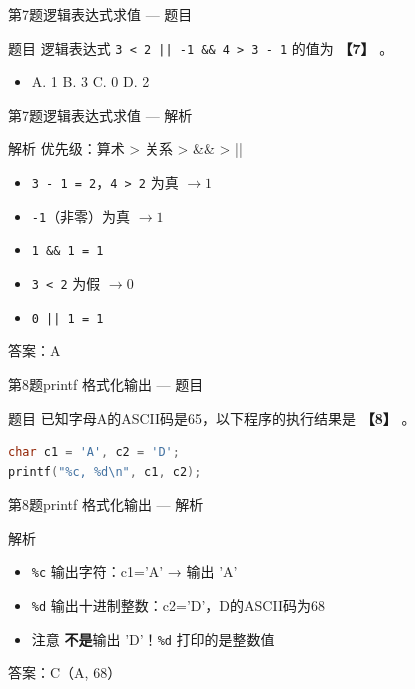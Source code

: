 \begin{frame}{第7题}{逻辑表达式求值 --- 题目}
    \begin{exampleblock}{题目}
        逻辑表达式 \texttt{3 < 2 || -1 \&\& 4 > 3 - 1} 的值为 \textbf{【7】} 。
        \begin{itemize}
            \item A. 1 \quad B. 3 \quad C. 0 \quad D. 2
        \end{itemize}
    \end{exampleblock}
\end{frame}

\begin{frame}{第7题}{逻辑表达式求值 --- 解析}
    \begin{alertblock}{解析}
        \footnotesize 优先级：算术 > 关系 > \&\& > ||
        \begin{itemize}
            \setlength{\itemsep}{0pt}
            \item \texttt{3 - 1 = 2}，\texttt{4 > 2} 为真 $\to 1$
            \item \texttt{-1}（非零）为真 $\to 1$
            \item \texttt{1 \&\& 1 = 1}
            \item \texttt{3 < 2} 为假 $\to 0$
            \item \texttt{0 || 1 = 1}
        \end{itemize}
        {\color{highlight}答案：A}
    \end{alertblock}
\end{frame}

\begin{frame}[fragile]{第8题}{printf 格式化输出 --- 题目}
    \begin{exampleblock}{题目}
        已知字母A的ASCII码是65，以下程序的执行结果是 \textbf{【8】} 。
    \end{exampleblock}

    \begin{lstlisting}[language=C, basicstyle=\footnotesize\ttfamily]
char c1 = 'A', c2 = 'D';
printf("%c, %d\n", c1, c2);
\end{lstlisting}
\end{frame}

\begin{frame}{第8题}{printf 格式化输出 --- 解析}
    \begin{alertblock}{解析}
        \small
        \begin{itemize}
            \item \texttt{\%c} 输出字符：c1='A' → 输出 'A'
            \item \texttt{\%d} 输出十进制整数：c2='D'，D的ASCII码为68
            \item 注意 \textbf{不是}输出 'D'！\texttt{\%d} 打印的是整数值
        \end{itemize}
        {\color{highlight}答案：C（A, 68）}
    \end{alertblock}
\end{frame}

